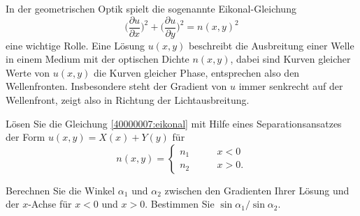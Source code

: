 In der geometrischen Optik spielt die sogenannte Eikonal-Gleichung
\begin{equation}
\biggl( \frac{\partial u}{\partial x}\biggr)^2
+
\biggl( \frac{\partial u}{\partial y}\biggr)^2
=
n(x,y)^2
\label{40000007:eikonal}
\end{equation}
eine wichtige Rolle.
Eine Lösung $u(x,y)$ beschreibt die
Ausbreitung einer Welle in einem Medium mit der optischen
Dichte  $n(x,y)$, dabei sind Kurven gleicher Werte von $u(x,y)$
die Kurven gleicher Phase, entsprechen also den Wellenfronten.
Insbesondere steht der Gradient von $u$ immer senkrecht auf
der Wellenfront, zeigt also in Richtung der Lichtausbreitung.
\begin{teilaufgaben}
\item
Lösen Sie die Gleichung
\eqref{40000007:eikonal} mit Hilfe eines Separationsansatzes
der Form $u(x,y)=X(x) + Y(y)$
für 
\[
n(x,y)=
\begin{cases}n_1&\qquad x< 0\\
n_2&\qquad x>0.
\end{cases}
\]
\item
Berechnen Sie die Winkel $\alpha_1$ und $\alpha_2$ zwischen den Gradienten
Ihrer Lösung und der $x$-Achse für $x<0$ und $x>0$. Bestimmen Sie 
$\sin\alpha_1/\sin\alpha_2$.
\end{teilaufgaben}

